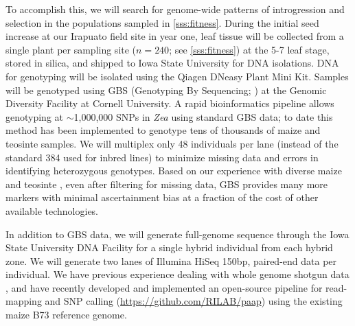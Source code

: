 To accomplish this, we will search for genome-wide patterns of introgression and selection in the populations sampled in \ref{sss:fitness}.
During the initial seed increase at our Irapuato field site in year one, leaf tissue will be collected from a single plant per sampling site ($n=240$; see \ref{sss:fitness}) at the 5-7 leaf stage, stored in silica, and shipped to Iowa State University for DNA isolations.
DNA for genotyping will be isolated using the Qiagen DNeasy Plant Mini Kit.
Samples will be genotyped using GBS (Genotyping By Sequencing; \citealt{Elshire2011}) at the Genomic Diversity Facility at Cornell University.
A rapid bioinformatics pipeline \citep[TASSLE-GBS; ][]{Glaubitz2014} allows genotyping at $\sim$1,000,000 SNPs in \emph{Zea}  using standard GBS data; to date this method has been implemented to genotype tens of thousands of maize and teosinte samples.
We will multiplex only 48 individuals per lane (instead of the standard 384 used for inbred lines) to minimize missing data and errors in identifying heterozygous genotypes. 
Based on our experience with diverse maize and teosinte \citep[\emph{e.g.,}][]{Takuno15062015}, even after filtering for missing data, GBS provides many more markers with minimal ascertainment bias at a fraction of the cost of other available technologies. 

In addition to GBS data, we will generate full-genome sequence through the Iowa State University DNA Facility for a single hybrid individual from each hybrid zone.  
We will generate two lanes of Illumina HiSeq 150bp, paired-end data per individual. 
We have previous experience dealing with whole genome shotgun data \citep{Chia2012a,  Hufford2012b, da2015origin}, and have recently developed and implemented an open-source pipeline for read-mapping and SNP calling (\url{https://github.com/RILAB/paap}) using the existing maize B73 reference genome. 
 
